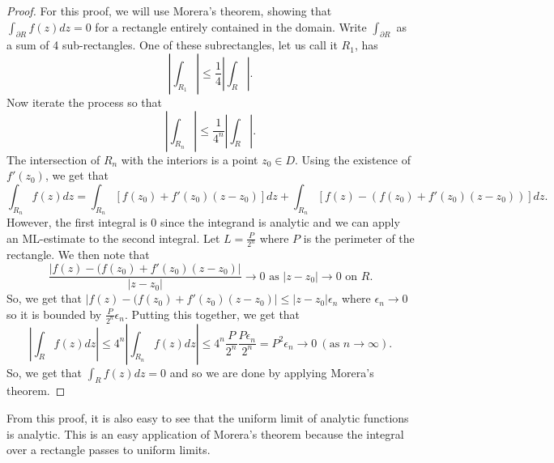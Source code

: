 \documentclass[11pt,leqno,oneside]{amsart}
\begin{document}
  \begin{proof}
    For this proof, we will use Morera's theorem, showing that
    $\int_{\partial R} f(z)dz = 0$ for a rectangle entirely contained
    in the domain. Write $\int_{\partial R}$ as a sum of 4
    sub-rectangles. One of these subrectangles, let us call it $R_1$,
    has \[
      \left|
        \int_{R_1}
      \right| \leq 
      \frac{1}{4}\left|
        \int_R
      \right|.
    \]
    Now iterate the process so that \[
      \left|
        \int_{R_n}
      \right| \leq
      \frac{1}{4^n}\left|
        \int_R
      \right|.
    \]
    The intersection of $R_n$ with the interiors is a point $z_0 \in
    D$. Using the existence of $f'(z_0)$, we get that \[
      \int_{R_n} f(z)dz = \int_{R_n} [f(z_0) + f'(z_0)(z-z_0)]dz +
      \int_{R_n} [f(z) - (f(z_0) + f'(z_0)(z-z_0))]dz.
    \]
    However, the first integral is 0 since the integrand is analytic
    and we can apply an ML-estimate to the second integral. Let $L =
    \frac{P}{2^n}$ where $P$ is the perimeter of the rectangle. We
    then note that \[
      \frac{|f(z)-(f(z_0) + f'(z_0)(z-z_0)|}{|z-z_0|} \to 0 \text{ as
      } |z-z_0| \to 0 \text{ on } R.
    \]
    So, we get that $|f(z)-(f(z_0) + f'(z_0)(z-z_0)| \leq |z-z_0|
    \epsilon_n$ where $\epsilon_n \to 0$ so it is bounded by
    $\frac{P}{2^n}\epsilon_n$. Putting this together, we get that \[
      \left|
        \int_R f(z)dz
      \right| \leq 4^n 
      \left|
        \int_{R_n} f(z)dz
      \right| \leq 4^n \frac{P}{2^n}\frac{P \epsilon_n}{2^n} = P^2
      \epsilon_n \to 0 ~ (\text{as }n \to \infty).
    \]
    So, we get that $\int_R f(z)dz = 0$ and so we are done by applying
    Morera's theorem.
  \end{proof}
  From this proof, it is also easy to see that the uniform limit of
  analytic functions is analytic. This is an easy application of
  Morera's theorem because the integral over a rectangle passes to
  uniform limits.
\end{document}
